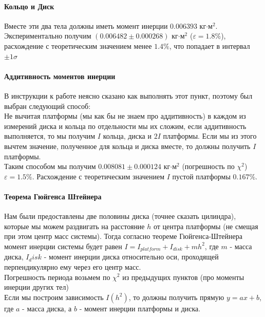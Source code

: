\documentclass[a4paper,12pt]{article}
\begin{document}
	\paragraph{Кольцо и Диск}
	Вместе эти два тела должны иметь момент инерции $0.006393$ кг$\cdot$м$^2$. Экспериментально получим $(0.006482\pm 0.000268)$ кг$\cdot$м$^2$ ($\varepsilon=1.8\%$), расхождение с теоретическим значением менее $1.4\%$, что попадает в интервал $\pm 1 \sigma$
	
	\paragraph{Аддитивность моментов инерции}
	
	В инструкции к работе неясно сказано как выполнять этот пункт, поэтому был выбран следующий способ:\\
	
	Не вычитая платформы (мы как бы не знаем про аддитивность) в каждом из измерений диска и кольца по отдельности мы их сложим, если аддитивность выполняется, то мы получим $I$ кольца, диска и $2I$ платформы. Если мы из этого вычтем значение, полученное для кольца и диска вместе, то должны получить $I$ платформы.\\
	
	Таким способом мы получим $0.008081\pm 0.000124$ кг$\cdot$м$^2$ (погрешность по $\chi^2$) $\varepsilon=1.5\%$. Расхождение с теоретическим значением $I$ пустой платформы $0.167\%$.
	
	\paragraph{Теорема Гюйгенса Штейнера}
	Нам были предоставлены две половины диска (точнее сказать цилиндра), которые мы можем раздвигать на расстояние $h$ от центра платформы (не смещая при этом центр масс системы). Тогда согласно теореме Гюйгенса-Штейнера момент инерции системы будет равен $I=I_{platform}+I_{disk}+mh^2$, где $m$ - масса диска, $I_disk$ - момент инерции диска относительно оси, проходящей перпендикулярно ему через его центр масс.\\
	
	Погрешность периода возьмем по $\chi^2$ из предыдущих пунктов (про моменты инерции других тел)\\
	
	Если мы построим зависимость $I(h^2)$, то должны получить прямую $y=ax+b$, где $a$ - масса диска, а $b$ - момент инерции платформы и диска.\\
	
\end{document}

